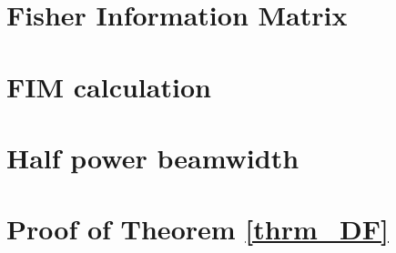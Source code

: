 \chapter{Fisher Information Matrix}
\label{apdx:FIM}

\chapter{FIM calculation}
\label{apdx_clacFim}

\chapter{Half power beamwidth}
\label{apdx_HPBW}

\chapter{Proof of Theorem \ref{thrm_DF}}
\label{apdx_thrm_DF}






